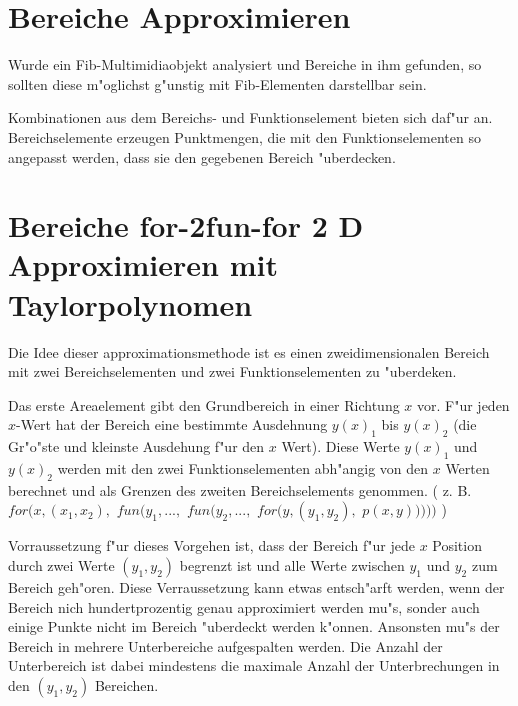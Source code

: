 




\section{Bereiche Approximieren}

Wurde ein Fib-Multimidiaobjekt analysiert und Bereiche in ihm gefunden, so sollten diese m"oglichst g"unstig mit Fib-Elementen darstellbar sein.

Kombinationen aus dem Bereichs- und Funktionselement bieten sich daf"ur an. Bereichselemente erzeugen Punktmengen, die mit den Funktionselementen so angepasst werden, dass sie den gegebenen Bereich "uberdecken.



\section{Bereiche for-2fun-for 2 D Approximieren mit Taylorpolynomen}

Die Idee dieser approximationsmethode ist es einen zweidimensionalen Bereich mit zwei Bereichselementen und zwei Funktionselementen zu "uberdeken.

Das erste Areaelement gibt den Grundbereich in einer Richtung $x$ vor. F"ur jeden $x$-Wert hat der Bereich eine bestimmte Ausdehnung $y(x)_1$ bis $y(x)_2$ (die Gr"o"ste und kleinste Ausdehung f"ur den $x$ Wert). Diese Werte $y(x)_1$ und $y(x)_2$ werden mit den zwei Funktionselementen abh"angig von den $x$ Werten berechnet und als Grenzen des zweiten Bereichselements genommen. ( z. B. $for( x, (x_1,x_2),$ $fun( y_1, ...,$ $fun( y_2, ...,$ $for( y, (y_1, y_2),$ $p(x,y) ) ) ) )$ )


Vorraussetzung f"ur dieses Vorgehen ist, dass der Bereich f"ur jede $x$ Position durch zwei Werte $(y_1, y_2)$ begrenzt ist und alle Werte zwischen $y_1$ und $y_2$ zum Bereich geh"oren. Diese Verraussetzung kann etwas entsch"arft werden, wenn der Bereich nich hundertprozentig genau approximiert werden mu"s, sonder auch einige Punkte nicht im Bereich "uberdeckt werden k"onnen.
Ansonsten mu"s der Bereich in mehrere Unterbereiche aufgespalten werden. Die Anzahl der Unterbereich ist dabei mindestens die maximale Anzahl der Unterbrechungen in den $(y_1, y_2)$ Bereichen.

